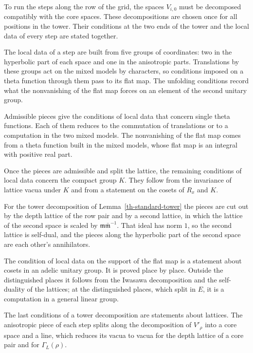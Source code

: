 To run the steps along the row of the grid, the spaces $V_{i,0}$ must be
decomposed compatibly with the core spaces. These decompositions are chosen
once for all positions in the tower. Their conditions at the two ends of the tower
and the local data of every step are stated together.

The local data of a step are built from five groups of coordinates: two in the
hyperbolic part of each space and one in the anisotropic parts. Translations by
these groups act on the mixed models by characters, so conditions imposed on a
theta function through them pass to its flat map. The unfolding conditions
record what the nonvanishing of the flat map forces on an element of the second
unitary group.

Admissible pieces give the conditions of local data that concern single theta
functions. Each of them reduces to the commutation of translations or to a
computation in the two mixed models. The nonvanishing of the flat map comes from
a theta function built in the mixed models, whose flat map is an integral with
positive real part.

Once the pieces are admissible and split the lattice, the remaining conditions
of local data concern the compact group $K$. They follow from the invariance of
lattice vacua under $K$ and from a statement on the cosets of $R_x$ and $K$.

For the tower decomposition of Lemma~\ref{th-standard-tower} the pieces are cut
out by the depth lattice of the row pair and by a second lattice, in which the
lattice of the second space is scaled by $\mathfrak m\bar{\mathfrak m}^{-1}$. That
ideal has norm $1$, so the second lattice is self-dual, and the pieces along the
hyperbolic part of the second space are each other's annihilators.

The condition of local data on the support of the flat map is a statement about
cosets in an adelic unitary group. It is proved place by place. Outside the
distinguished places it follows from the Iwasawa decomposition and the
self-duality of the lattices; at the distinguished places, which split in $E$,
it is a computation in a general linear group.

The last conditions of a tower decomposition are statements about lattices. The
anisotropic piece of each step splits along the decomposition of $V'_\rho$ into a
core space and a line, which reduces its vacua to vacua for the depth lattice of
a core pair and for $\Gamma_L(\rho)$.

